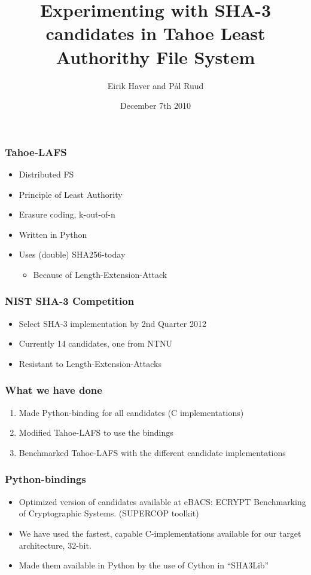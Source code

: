 \documentclass[screen]{beamer}
\title[SHA-3 in Tahoe-LAFS]%
{Experimenting with SHA-3 candidates in Tahoe Least Authorithy File System}
\author[EH \& PR]{Eirik Haver and Pål Ruud}
\institute[NTNU]{Department of Telematics}
\date{December 7th 2010}
\begin{document}
\ntnutitlepage

\begin{frame}
  \frametitle{Tahoe-LAFS}
  \begin{itemize}
  \item Distributed FS
  \item Principle of Least Authority
  \item Erasure coding, k-out-of-n
  \item Written in Python
  \item Uses (double) SHA256-today
    \begin{itemize}
        \item Because of Length-Extension-Attack
    \end{itemize}
  \end{itemize}
\end{frame}

\begin{frame}
  \frametitle{NIST SHA-3 Competition}
  \begin{itemize}
  \item Select SHA-3 implementation by 2nd Quarter 2012
  \item Currently 14 candidates, one from NTNU
  \item Resistant to Length-Extension-Attacks
  \end{itemize}
\end{frame}

\begin{frame}
  \frametitle{What we have done}
  \begin{enumerate}
  \item Made Python-binding for all candidates (C implementations) 
  \item Modified Tahoe-LAFS to use the bindings
  \item Benchmarked Tahoe-LAFS with the different candidate implementations
  \end{enumerate}
\end{frame}

\begin{frame}
  \frametitle{Python-bindings}
  \begin{itemize}
  \item Optimized version of candidates available at eBACS: ECRYPT Benchmarking
  of Cryptographic Systems. (SUPERCOP toolkit)
  \item We have used the fastest, capable C-implementations available for our target
  architecture, 32-bit.
  \item Made them available in Python by the use of Cython in ``SHA3Lib''
  \end{itemize}
\end{frame}
\end{document}
